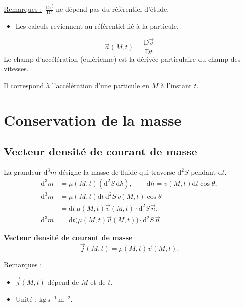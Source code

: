 \documentclass[11pt,a4paper]{article}
\newcommand{\dd}{\mathrm d}
\newcommand{\vv}{\vec v}
\newcommand{\JJ}{\vec{j}}
\newcommand{\Dt}[1]{\frac{\mathrm D #1}{\mathrm D t}}
\newcommand{\rem}{\underline{Remarques :}\ }
\begin{document}
\rem $\Dt{\vv}$ ne dépend pas du référentiel d'étude.
\begin{itemize}\item Les calculs reviennent au référentiel lié à la particule.\end{itemize}
\[\vec a(M,t)=\Dt{\vv}\]
Le champ d'accélération (eulérienne) est la dérivée particulaire du champ des vitesses.

Il correspond à l'accélération d'une particule en $M$ à l'instant $t$.
\section{Conservation de la masse}
\subsection{Vecteur densité de courant de masse}
\begin{center}
\end{center}
La grandeur $\dd^3m$ désigne la masse de fluide qui traverse $\dd^2S$ pendant $\dd t$.
\begin{align*}
\dd^3m&=\mu(M,t)(\dd^2S\,\dd h),\qquad \dd h=v(M,t)\dd t\cos\theta,\\
\dd^3m&=\mu(M,t)\dd t\,\dd^2S\,v(M,t)\cos\theta\\
&=\dd t\,\mu(M,t)\vv(M,t)\cdot\dd^2S\,\vec n,\\
\dd^3m&=\dd t\bigl(\mu(M,t)\vv(M,t)\bigr)\cdot\dd^2S\,\vec n.
\end{align*}
\begin{cadre}
\textbf{Vecteur densité de courant de masse}
\[\JJ(M,t)=\mu(M,t)\vv(M,t).\]
\end{cadre}
\rem
\begin{itemize}\item $\JJ(M,t)$ dépend de $M$ et de $t$.\item Unité : $\mathrm{kg\,s^{-1}\,m^{-2}}$.\end{itemize}
\end{document}
